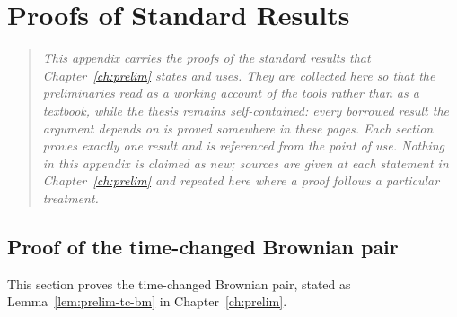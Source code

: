 \documentclass[../../main.tex]{subfiles}
\begin{document}
\chapter{Proofs of Standard Results}\label{appB-proofs-standard}\label{app:proofs}

\begin{quote}\itshape
This appendix carries the proofs of the standard results that Chapter~\ref{ch:prelim} states and uses. They are collected here so that the preliminaries read as a working account of the tools rather than as a textbook, while the thesis remains self-contained: every borrowed result the argument depends on is proved somewhere in these pages. Each section proves exactly one result and is referenced from the point of use. Nothing in this appendix is claimed as new; sources are given at each statement in Chapter~\ref{ch:prelim} and repeated here where a proof follows a particular treatment.
\end{quote}

\section{Proof of the time-changed Brownian pair}\label{appB:tcbm}

This section proves the time-changed Brownian pair, stated as Lemma~\ref{lem:prelim-tc-bm} in Chapter~\ref{ch:prelim}.
\end{document}
